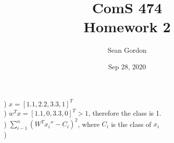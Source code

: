 \documentclass[12pt]{article}
\title{ComS 474\\Homework 2}
\author{Sean Gordon}
\date{Sep 28, 2020}
\begin{document}
\maketitle



) $x = [1.1, 2.2, 3.3, 1]^T$\\


) $w^Tx = [1.1, 0, 3.3, 0]^T > 1$, therefore the class is 1.\\


) {\large $\sum_{i-1}^{n}(W^Tx_i'' - C_i)^2$}, where $C_i$ is the class of $x_i$\\


) 


\noindent \hrulefill \\\pagebreak

\end{document}
